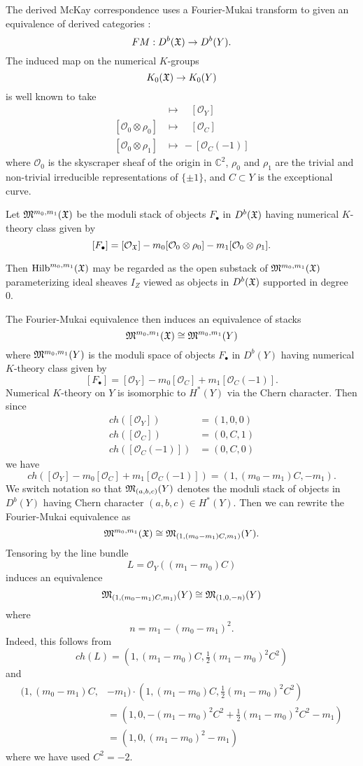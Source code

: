 \documentclass{article}
\theoremstyle{definition}
\newcommand{\CC} {{\mathbb C}}          %
\newcommand{\X}{\frak{X}}
\newcommand{\M}{\frak{M}}
\renewcommand{\O}{\mathcal{O}}
\newcommand{\Hilb}{\operatorname{Hilb}}
\begin{document}
The derived McKay correspondence uses a Fourier-Mukai transform to
given an equivalence of derived categories \cite{BKR}:
\[
FM:D^{b}(\X )\to D^{b}(Y).
\]
The induced map on the numerical $K$-groups
\[
K_{0}(\X ) \to K_{0}(Y)
\]
is well known to take
\begin{align*}
[\O_{\X}]& \longmapsto \quad [\O_{Y}] \\
[\O_{0}\otimes \rho_{0}] &\longmapsto  \quad [\O_{C}]\\
[\O_{0}\otimes \rho_{1}] &\longmapsto \, -[\O_{C}(-1)]
\end{align*}
where $\O_{0}$ is the skyscraper sheaf of the origin in $\CC^{2}$,
$\rho_{0}$ and $\rho_{1}$ are the trivial and non-trivial irreducible
representations of $\{\pm 1 \}$, and $C\subset Y$ is the exceptional
curve.

Let $\M^{m_{0},m_{1}}(\X )$ be the moduli stack of objects $F_{\bullet }$ in
$D^{b}(\X )$ having numerical $K$-theory class given by
\[
[F_{\bullet}] = [\O_{\X}] - m_{0}[\O_{0}\otimes \rho_{0}]  - m_{1}[\O_{0}\otimes \rho_{1}] .
\]

Then $\Hilb^{m_{0},m_{1}}(\X )$ may be regarded as the  open substack
of $\M^{m_{0},m_{1}}(\X )$ parameterizing ideal sheaves $I_{Z}$ viewed
as objects in $D^{b}(\X )$ supported in degree 0.

The Fourier-Mukai equivalence then induces an equivalence of stacks
\[
\M^{m_{0},m_{1}}(\X ) \cong  \M^{m_{0},m_{1}}(Y)
\]
where $ \M^{m_{0},m_{1}}(Y)$ is the moduli space of objects
$F_{\bullet}$ in $D^{b}(Y)$ having numerical $K$-theory class given by
\[
[F_{\bullet}] = [\O_{Y}] - m_{0} [\O_{C}]+ m_{1} [\O_{C}(-1)]. 
\]
Numerical $K$-theory on $Y$ is isomorphic to $H^{*}(Y)$ via the Chern
character. Then since
\begin{align*}
ch([\O_{Y}]) &= (1,0,0)\\
ch([\O_{C}]) &= (0,C,1)\\
ch([\O_{C}(-1)]) &= (0,C,0)
\end{align*}
we have
\[
ch( [\O_{Y}] - m_{0} [\O_{C}]+ m_{1} [\O_{C}(-1)]) = (1,(m_{0}-m_{1})C,-m_{1}).
\]
We switch notation so that $\M_{(a,b,c)}(Y)$ denotes the moduli stack
of objects in $D^{b}(Y)$ having Chern character $(a,b,c)\in
H^{*}(Y)$. Then we can rewrite the Fourier-Mukai equivalence as
\[
\M^{m_{0},m_{1}}(\X ) \cong \M_{(1,(m_{0}-m_{1})C,m_{1})}(Y). 
\]
Tensoring by the line bundle
\[
L = \O_{Y}((m_{1}-m_{0})C)
\]
induces an equivalence
\[
\M_{(1,(m_{0}-m_{1})C,m_{1})}(Y) \cong \M_{(1,0,-n)}(Y)
\]
where
\[
n=m_{1} -(m_{0}-m_{1})^{2}. 
\]
Indeed, this follows from
\[
ch(L) = \left(1,(m_{1}-m_{0})C,\tfrac{1}{2} (m_{1}-m_{0})^{2}C^{2} \right)
\]
and 
\begin{align*}
(1,(m_{0}-m_{1})C,&-m_{1}) \cdot  (1,(m_{1}-m_{0})C,\tfrac{1}{2}
(m_{1}-m_{0})^{2}C^{2})\\
 &= (1,0, - (m_{1}-m_{0})^{2}C^{2} +\tfrac{1}{2}
(m_{1}-m_{0})^{2}C^{2} -m_{1})\\
&= (1,0,(m_{1}-m_{0})^{2}-m_{1})
\end{align*}
where we have used $C^{2}=-2$.
\end{document}
